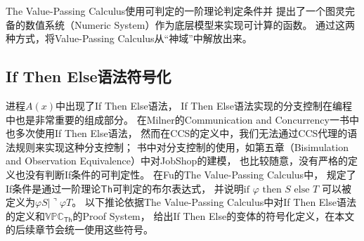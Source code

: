 The Value-Passing Calculus使用可判定的一阶理论判定条件并
提出了一个图灵完备的数值系统（Numeric System）作为底层模型来实现可计算的函数。
通过这两种方式，将Value-Passing Calculus从“神域”中解放出来。

\subsection{If Then Else语法符号化}
进程$A(x)$中出现了If Then Else语法，
If Then Else语法实现的分支控制在编程中也是非常重要的组成部分。
在Milner的Communication and Concurrency一书中也多次使用If Then Else语法，
然而在CCS的定义中，我们无法通过CCS代理的语法规则来实现这种分支控制；
书中对分支控制的使用，如第五章（Bisimulation and Observation Equivalence）中对JobShop的建模，
也比较随意，没有严格的定义也没有判断If条件的可判定性。
在Fu的The Value-Passing Calculus中，
规定了If条件是通过一阶理论$\mathsf{Th}$可判定的布尔表达式，
并说明$\textrm{if }\varphi\textrm{ then }S\textrm{ else }T$
可以被定义为$\varphi S|\urcorner \varphi T$。
以下推论依据The Value-Passing Calculus中对If Then Else语法的定义和$\mathbb{VPC}_{\mathsf{Th}}$的Proof System，
给出If Then Else的变体的符号化定义，在本文的后续章节会统一使用这些符号。

